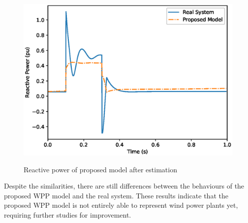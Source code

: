 \begin{figure}[!h]
	\centering
	\caption{Reactive power of proposed model after estimation}
	\includegraphics[scale=.7]{Images/Q_proposed_estimated.eps}
	\label{fig: estimation_proposed_Q}
\end{figure}

Despite the similarities, there are still differences between the behaviours of the proposed WPP model and the real system. These results indicate that the proposed WPP model is not entirely able to represent wind power plants yet, requiring further studies for improvement.